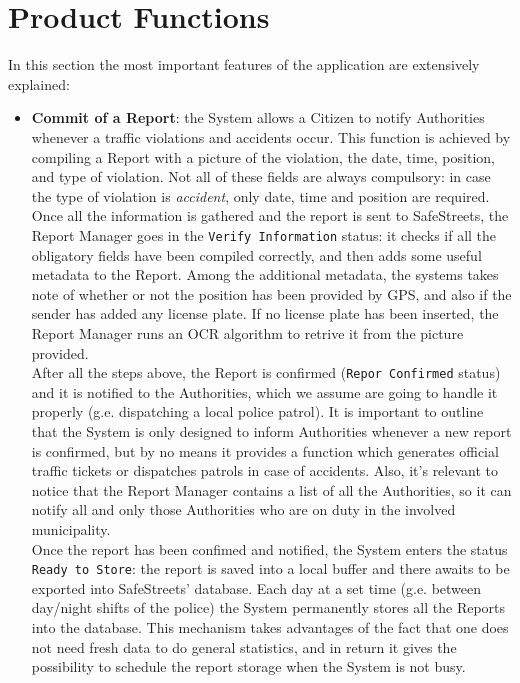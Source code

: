 \documentclass{report}
\begin{document}
\newpage
\section{Product Functions}
In this section the most important features of the application are extensively explained:
\begin{itemize}
	\item \textbf{Commit of a Report}: the System allows a Citizen to notify Authorities whenever a traffic violations and accidents occur. This function is achieved by compiling a Report with a picture of the violation, the date, time, position, and type of violation. Not all of these fields are always compulsory: in case the type of violation is \textit{accident}, only date, time and position are required. Once all the information is gathered and the report is sent to SafeStreets, the Report Manager goes in the \texttt{Verify Information} status: it checks if all the obligatory fields have been compiled correctly, and then adds some useful metadata to the Report. Among the additional metadata, the systems takes note of whether or not the position has been provided by GPS, and also if the sender has added any license plate. If no license plate has been inserted, the Report Manager runs an OCR algorithm to retrive it from the picture provided. \\
	After all the steps above, the Report is confirmed (\texttt{Repor Confirmed} status) and it is notified to the Authorities, which we assume are going to handle it properly (g.e. dispatching a local police patrol). It is important to outline that the System is only designed to inform Authorities whenever a new report is confirmed, but by no means it provides a function which generates official traffic tickets or dispatches patrols in case of accidents. Also, it's relevant to notice that the Report Manager contains a list of all the Authorities, so it can notify all and only those Authorities who are on duty in the involved municipality. \\
	Once the report has been confimed and notified, the System enters the status \texttt{Ready to Store}: the report is saved into a local buffer and there awaits to be exported into SafeStreets' database. Each day at a set time (g.e. between day/night shifts of the police) the System permanently stores all the Reports into the database. This mechanism takes advantages of the fact that one does not need fresh data to do general statistics, and in return it gives the possibility to schedule the report storage when the System is not busy.


\end{itemize}
\end{document}
